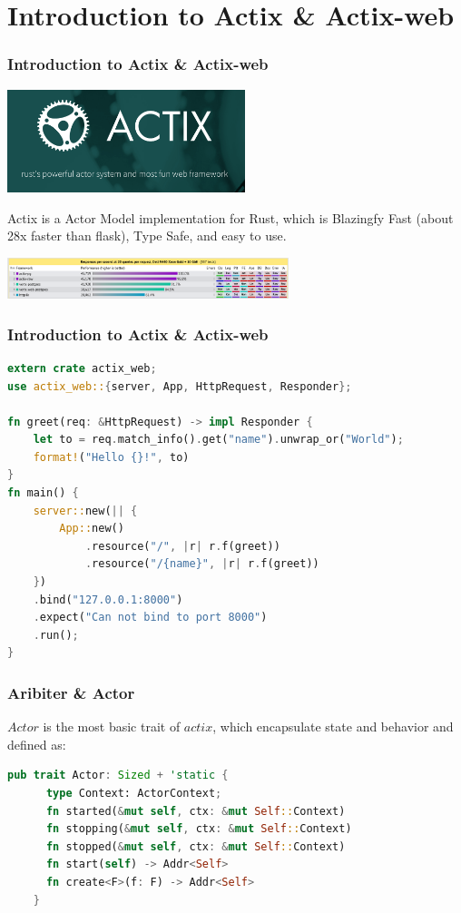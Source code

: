 \documentclass[notheorems, aspectratio=54]{beamer}
\begin{document}
\section{Introduction to Actix \& Actix-web}
\begin{frame}
  \frametitle{Introduction to Actix \& Actix-web}
  \begin{center}
    \includegraphics[height=3cm]{./actix.png}
  \end{center}
  Actix is a Actor Model implementation for Rust\cite{actix}, which is Blazingfy Fast (about 28x faster than flask\cite{bm}), Type Safe, and easy to use.
    \begin{center}
    \includegraphics[height=1.2cm]{./bm.png}
  \end{center}

\end{frame}

\begin{frame}[fragile]
  \frametitle{Introduction to Actix \& Actix-web}
  \begin{lstlisting}[language=Rust]
extern crate actix_web;
use actix_web::{server, App, HttpRequest, Responder};

fn greet(req: &HttpRequest) -> impl Responder {
    let to = req.match_info().get("name").unwrap_or("World");
    format!("Hello {}!", to)
}
fn main() {
    server::new(|| {
        App::new()
            .resource("/", |r| r.f(greet))
            .resource("/{name}", |r| r.f(greet))
    })
    .bind("127.0.0.1:8000")
    .expect("Can not bind to port 8000")
    .run();
}

   \end{lstlisting}
 \end{frame}

\begin{frame}[fragile]
  \frametitle{Aribiter \& Actor}
  $Actor$ is the most basic trait of $actix$, which encapsulate state and behavior and defined as:
  \begin{lstlisting}[language=Rust]
    pub trait Actor: Sized + 'static {
      type Context: ActorContext;
      fn started(&mut self, ctx: &mut Self::Context)
      fn stopping(&mut self, ctx: &mut Self::Context)
      fn stopped(&mut self, ctx: &mut Self::Context)
      fn start(self) -> Addr<Self>
      fn create<F>(f: F) -> Addr<Self>
    }
  \end{lstlisting}
\end{frame}
\end{document}
